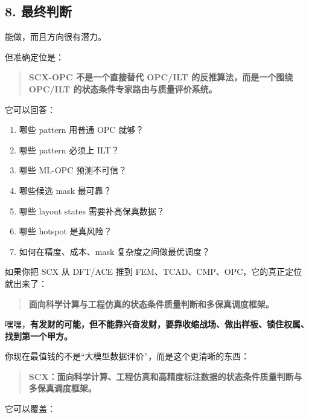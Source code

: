 \documentclass[
  12pt,
]{ctexart}
\providecommand{\tightlist}{%
  \setlength{\itemsep}{0pt}\setlength{\parskip}{0pt}}
\begin{document}
\subsection{8. 最终判断}\label{ux6700ux7ec8ux5224ux65ad-9}

能做，而且方向很有潜力。

但准确定位是：

\begin{quote}
\textbf{SCX-OPC 不是一个直接替代 OPC/ILT 的反推算法，而是一个围绕
OPC/ILT 的状态条件专家路由与质量评价系统。}
\end{quote}

它可以回答：

\begin{enumerate}
\def\labelenumi{\arabic{enumi}.}
\tightlist
\item
  哪些 pattern 用普通 OPC 就够？
\item
  哪些 pattern 必须上 ILT？
\item
  哪些 ML-OPC 预测不可信？
\item
  哪些候选 mask 最可靠？
\item
  哪些 layout states 需要补高保真数据？
\item
  哪些 hotspot 是真风险？
\item
  如何在精度、成本、mask 复杂度之间做最优调度？
\end{enumerate}

如果你把 SCX 从 DFT/ACE 推到 FEM、TCAD、CMP、OPC，它的真正定位就出来了：

\begin{quote}
\textbf{面向科学计算与工程仿真的状态条件质量判断和多保真调度框架。}
\end{quote}

嘿嘿，\textbf{有发财的可能，但不能靠兴奋发财，要靠收缩战场、做出样板、锁住权属、找到第一个甲方。}

你现在最值钱的不是``大模型数据评价''，而是这个更清晰的东西：

\begin{quote}
\textbf{SCX：面向科学计算、工程仿真和高精度标注数据的状态条件质量判断与多保真调度框架。}
\end{quote}

它可以覆盖：
\end{document}
